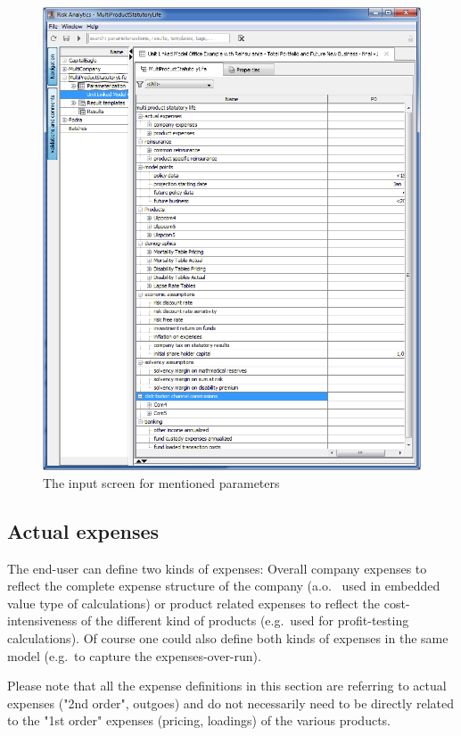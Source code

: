 \begin{figure}
\includegraphics[scale=0.7]{images/lifep14n.png}
	\caption{The input screen for mentioned parameters}
	\label{fig:lifep14n}
\end{figure}

\subsection{Actual expenses}

The end-user can define two kinds of expenses: Overall company expenses to reflect the complete expense structure of the company (a.o.~ used in embedded value type of calculations) or product related expenses to reflect the cost-intensiveness of the different kind of products (e.g.~used for profit-testing calculations). Of course one could also define both kinds of expenses in the same model (e.g.~to capture the expenses-over-run).

Please note that all the expense definitions in this section are referring to actual expenses ("2nd order", outgoes) and do not necessarily need to be directly related to the "1st order" expenses (pricing, loadings) of the various products.

